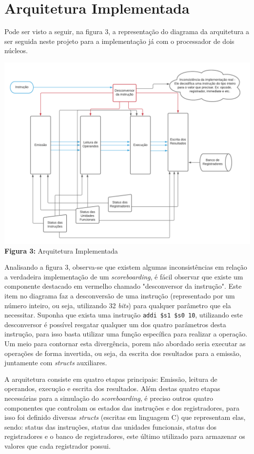\documentclass[journal]{IEEEtran}
\begin{document}
\section{Arquitetura Implementada}
Pode ser visto a seguir, na figura 3, a representação do diagrama da arquitetura a ser seguida neste projeto para a implementação já com o processador de dois núcleos.
\begin{center}
\includegraphics[scale=0.16]{arquitetura_implementada.png}\\
\textbf{Figura 3:} Arquitetura Implementada
\end{center}

Analisando a figura 3, observa-se que existem algumas inconsistências em relação a verdadeira implementação de um \textit{scoreboarding}, é fácil observar que existe um componente destacado em vermelho chamado "desconversor da instrução". Este item no diagrama faz a desconversão de uma instrução (representado por um número inteiro, ou seja, utilizando 32 \textit{bits})  para qualquer parâmetro que ela necessitar. Suponha que exista uma instrução \texttt{addi \$s1 \$s0 10}, utilizando este desconversor é possível resgatar qualquer um dos quatro parâmetros desta instrução, para isso basta utilizar uma função específica para realizar a operação. Um meio para contornar esta divergência, porem não abordado seria executar as operações de forma invertida, ou seja, da escrita dos resultados para a emissão, juntamente com \textit{structs} auxiliares.

A arquitetura consiste em quatro etapas principais: Emissão, leitura de operandos, execução e escrita dos resultados. Além destas quatro etapas necessárias para a simulação do \textit{scoreboarding}, é preciso outros quatro componentes que controlam os estados das instruções e dos registradores, para isso foi definido diversas \textit{structs} (escritas em linguagem C) que representam elas, sendo: status das instruções, status das unidades funcionais, status dos registradores e o banco de registradores, este último utilizado para armazenar os valores que cada registrador possui.
\end{document}
